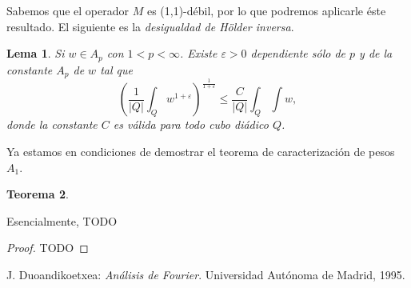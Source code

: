 \documentclass[12pt,english]{article}
\newtheorem{theorem}{Teorema}
\newtheorem{lemma}[theorem]{Lema}
\theoremstyle{definition}
\theoremstyle{remark}
\begin{document}
Sabemos que el operador $M$ es (1,1)-débil, por lo que podremos aplicarle éste resultado. El siguiente es la \emph{desigualdad de Hölder inversa}.

\begin{lemma} \label{lm: inverse holder} Si $w\in A_p$ con $1<p<\infty$. Existe $\varepsilon>0$ dependiente sólo de $p$ y de la constante $A_p$ de $w$ tal que
	\[\left(\frac{1}{|Q|}\int_Q w^{1+\varepsilon}\right)^{\frac{1}{1+\varepsilon}}\leq \frac{C}{|Q|}\int_Q\int w,\]
	donde la constante $C$ es válida para todo cubo diádico $Q$.
\end{lemma}

Ya estamos en condiciones de demostrar el teorema de caracterización de pesos $A_1$.

\begin{theorem}\label{thm: A1 characterization}
	
\end{theorem}

Esencialmente, TODO

\begin{proof}
	TODO
\end{proof}

\begin{thebibliography}{99}
 J. Duoandikoetxea: \emph{Análisis de Fourier}. Universidad Autónoma de Madrid, 1995.
\end{thebibliography}
\end{document}
